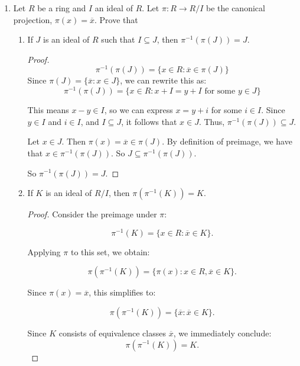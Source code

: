 \documentclass[12pt]{article}
\begin{document}
\begin{enumerate}
\begin{enumerate}
\begin{proof}
				Let $x \in \phi^{-1}(K), r \in R$. Then since $\phi$ is a homomorphism and $K$ is an ideal, $\phi(rx) = \phi(r)\phi(x) \in K$ because $\phi(r) \in S$ and $\phi(x) \in K$. So $rx \in \phi^{-1}(K)$.
				
				So $\phi^{-1}(K)$ is an ideal of $R$.
			\end{proof}
		\end{enumerate}
	
	
		\item Let $R$ be a ring and $I$ an ideal of $R$. Let $\pi : R \rightarrow R/I$ be the canonical projection, $\pi(x) = \overline{x}$. Prove that
		\begin{enumerate}
			\item If $J$ is an ideal of $R$ such that $I \subseteq J$, then $\pi^{-1}(\pi(J)) = J$.
			\begin{proof}
				\[\pi^{-1}(\pi(J)) = \{ x \in R : \overline{x} \in \pi(J) \}\]
				Since $\pi(J) = \{ \overline{x} : x \in J \}$, we can rewrite this as:
				\[\pi^{-1}(\pi(J)) = \{ x \in R : x + I = y + I \text{ for some } y \in J \}\]
				
				This means $x - y \in I$, so we can express $x = y + i$ for some $i \in I$. Since $y \in I$ and $i \in I$, and $I \subseteq J$, it follows that $x \in J$. Thus, $\pi^{-1}(\pi(J)) \subseteq J$.
				
				Let $x \in J$. Then $\pi(x) = \overline{x} \in \pi(J)$. By definition of preimage, we have that $x \in \pi^{-1}(\pi(J))$. So $J \subseteq \pi^{-1}(\pi(J))$.
				
				So $\pi^{-1}(\pi(J)) = J$.
			\end{proof}
			
			\item If $K$ is an ideal of $R/I$, then $\pi(\pi^{-1}(K)) = K$.
			\begin{proof}
				Consider the preimage under $\pi$:
				
				\[\pi^{-1}(K) = \{ x \in R : \overline{x} \in K \}.\]
				
				Applying $\pi$ to this set, we obtain:
				
				\[\pi(\pi^{-1}(K)) = \{ \pi(x) : x \in R, \overline{x} \in K \}.\]
				
				Since $\pi(x) = \overline{x}$, this simplifies to:
				
				\[\pi(\pi^{-1}(K)) = \{ \overline{x} : \overline{x} \in K \}.\]
				
				Since $K$ consists of equivalence classes $\overline{x}$, we immediately conclude:
				\[\pi(\pi^{-1}(K)) = K.\]
			\end{proof}
		\end{enumerate}
	

\end{enumerate}
\end{document}
